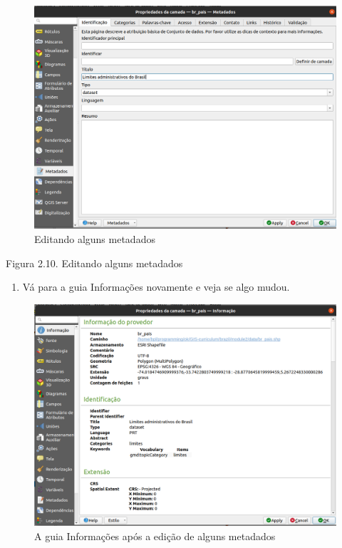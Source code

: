 \documentclass[
]{krantz}
\providecommand{\tightlist}{%
  \setlength{\itemsep}{0pt}\setlength{\parskip}{0pt}}
\begin{document}
\begin{figure}
\centering
\includegraphics{media/modulo2/metadata-2.png}
\caption{Editando alguns metadados}
\end{figure}

Figura 2.10. Editando alguns metadados

\begin{enumerate}
\def\labelenumi{\arabic{enumi}.}
\setcounter{enumi}{3}
\tightlist
\item
  Vá para a guia Informações novamente e veja se algo mudou.
\end{enumerate}

\begin{figure}
\centering
\includegraphics{media/modulo2/metadata-3.png}
\caption{A guia Informações após a edição de alguns metadados}
\end{figure}
\end{document}
